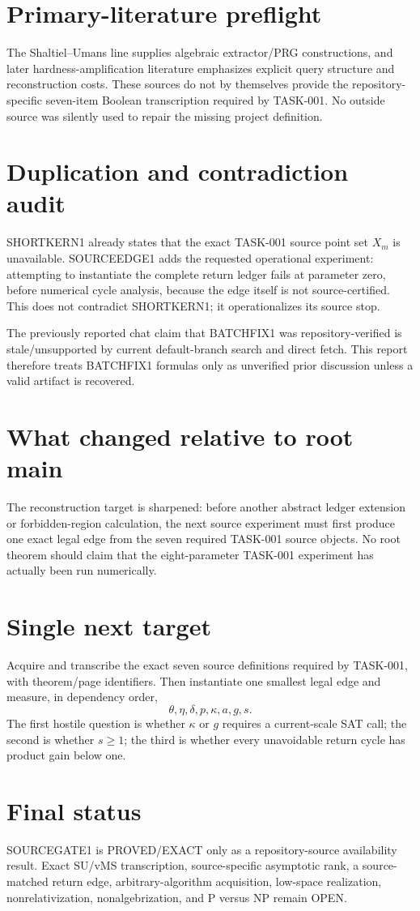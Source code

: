 \documentclass[11pt]{article}
\begin{document}
\section*{Primary-literature preflight}
The Shaltiel--Umans line supplies algebraic extractor/PRG constructions, and later hardness-amplification literature emphasizes explicit query structure and reconstruction costs. These sources do not by themselves provide the repository-specific seven-item Boolean transcription required by TASK-001. No outside source was silently used to repair the missing project definition.

\section*{Duplication and contradiction audit}
SHORTKERN1 already states that the exact TASK-001 source point set \(X_m\) is unavailable. SOURCEEDGE1 adds the requested operational experiment: attempting to instantiate the complete return ledger fails at parameter zero, before numerical cycle analysis, because the edge itself is not source-certified. This does not contradict SHORTKERN1; it operationalizes its source stop.

The previously reported chat claim that BATCHFIX1 was repository-verified is stale/unsupported by current default-branch search and direct fetch. This report therefore treats BATCHFIX1 formulas only as unverified prior discussion unless a valid artifact is recovered.

\section*{What changed relative to root main}
The reconstruction target is sharpened: before another abstract ledger extension or forbidden-region calculation, the next source experiment must first produce one exact legal edge from the seven required TASK-001 source objects. No root theorem should claim that the eight-parameter TASK-001 experiment has actually been run numerically.

\section*{Single next target}
Acquire and transcribe the exact seven source definitions required by TASK-001, with theorem/page identifiers. Then instantiate one smallest legal edge and measure, in dependency order,
\[
\theta,\eta,\delta,p,\kappa,a,g,s.
\]
The first hostile question is whether \(\kappa\) or \(g\) requires a current-scale SAT call; the second is whether \(s\ge1\); the third is whether every unavoidable return cycle has product gain below one.

\section*{Final status}
SOURCEGATE1 is PROVED/EXACT only as a repository-source availability result. Exact SU/vMS transcription, source-specific asymptotic rank, a source-matched return edge, arbitrary-algorithm acquisition, low-space realization, nonrelativization, nonalgebrization, and P versus NP remain OPEN.

\end{document}
